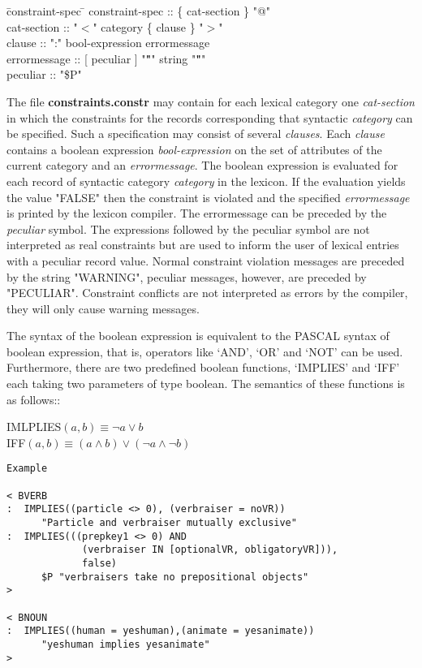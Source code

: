 \begin {tabbing}
   \= constraint-spec \= \kill
   \> constraint-spec \> :: \{ cat-section \} "@" \\
   \> cat-section     \> :: "$<$" category \{ clause \} "$>$" \\
   \> clause          \> :: ":" bool-expression errormessage \\
   \> errormessage    \> :: [ peculiar ] "{\bf "}" string "{\bf "}" \\
   \> peculiar        \> :: "\$P" 
\end {tabbing}

The file {\bf constraints.constr} may contain for each lexical category
one {\em cat-section} in which the constraints for the records corresponding
that syntactic {\em category} can be specified. Such a specification may 
consist of several {\em clauses}. Each {\em clause} contains a boolean 
expression {\em bool-expression} on the set of attributes of the current 
category and an {\em errormessage}. The boolean expression is evaluated
for each record of syntactic category {\em category} in the lexicon. 
If the evaluation
yields the value "FALSE" then the constraint is violated 
and the specified {\em errormessage} is printed by the
lexicon compiler. The errormessage can be preceded by the {\em peculiar}
symbol. The expressions followed by the peculiar symbol are not interpreted
as real constraints but are used to inform the user of lexical
entries with a peculiar record value. Normal constraint violation
messages are preceded by the string "WARNING", peculiar messages, however,
are preceded by "PECULIAR".
Constraint conflicts are not interpreted as errors by the compiler,
they will only cause warning messages.

The syntax of the boolean expression is equivalent to the PASCAL syntax
of boolean expression, that is, operators like `AND', `OR' and `NOT' can be 
used. Furthermore, there are two predefined boolean functions, `IMPLIES'
and `IFF' each taking two parameters of type boolean. The semantics of
these functions is as follows:: \\
\begin{tabbing}
IMLPLIES$(a, b) \equiv \neg a \vee b$ \\
IFF$(a, b) \equiv (a \wedge b) \vee (\neg a \wedge \neg b) $
\end{tabbing}

\begin{verbatim}
Example

< BVERB
:  IMPLIES((particle <> 0), (verbraiser = noVR))    
      "Particle and verbraiser mutually exclusive"           
:  IMPLIES(((prepkey1 <> 0) AND 
             (verbraiser IN [optionalVR, obligatoryVR])),
             false)                                             
      $P "verbraisers take no prepositional objects"
>

< BNOUN
:  IMPLIES((human = yeshuman),(animate = yesanimate)) 
      "yeshuman implies yesanimate"
>
\end{verbatim}

